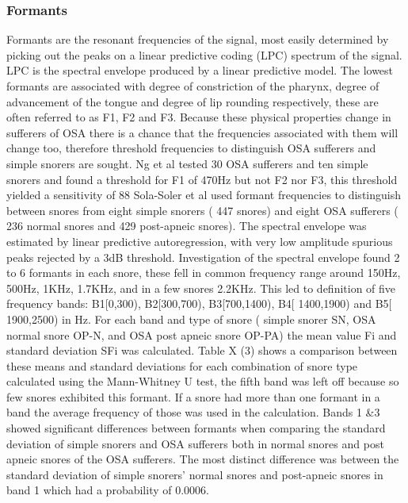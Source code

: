 \subsubsection{Formants}
Formants are the resonant frequencies of the signal, most easily determined by picking out the peaks on a linear predictive coding (LPC) spectrum of the signal. LPC is the spectral envelope produced by a linear predictive model. The lowest formants are associated with degree of constriction of the pharynx, degree of advancement of the tongue and degree of lip rounding respectively, these are often referred to as F1, F2 and F3. Because these physical properties change in sufferers of OSA there is a chance that the frequencies associated with them will change too, therefore threshold frequencies to distinguish OSA sufferers and simple snorers are sought. 
Ng et al tested 30 OSA sufferers and ten simple snorers and found a threshold for F1 of 470Hz but not F2 nor F3, this threshold yielded a sensitivity of 88%
Sola-Soler et al used formant frequencies to distinguish between snores from eight simple snorers ( 447 snores) and eight OSA sufferers ( 236 normal snores and 429 post-apneic snores). The spectral envelope was estimated by linear predictive autoregression, with very low amplitude spurious peaks rejected by a 3dB threshold. Investigation of the spectral envelope found 2 to 6 formants in each snore, these fell in common frequency range around 150Hz, 500Hz, 1KHz, 1.7KHz, and in a few snores 2.2KHz. This led to definition of five frequency bands: B1[0,300), B2[300,700), B3[700,1400), B4[ 1400,1900) and B5[ 1900,2500) in Hz. For each band and type of snore ( simple snorer SN, OSA normal snore OP-N, and OSA post apneic snore OP-PA) the mean value Fi and standard deviation SFi was calculated. Table X (3) shows a comparison between these means and standard deviations for each combination of snore type calculated using the Mann-Whitney U test, the fifth band was left off because so few snores exhibited this formant. If a snore had more than one formant in a band the average frequency of those was used in the calculation. Bands 1 &3 showed significant differences between formants when comparing the standard deviation of simple snorers and OSA sufferers both in normal snores and post apneic snores of the OSA sufferers. The most distinct difference was between the standard deviation of simple snorers’ normal snores and post-apneic snores in band 1 which had a probability of 0.0006. 
